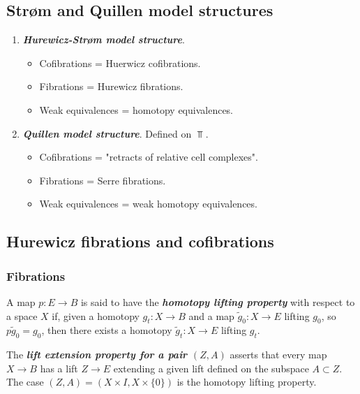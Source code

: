 \begin{remark}
\subsection{Str\o m and Quillen model structures}

\begin{example}\leavevmode
\begin{enumerate}
	\item \textbf{\textit{Hurewicz-Str\o m model structure}}.
	\begin{itemize}
		\item Cofibrations = Huerwicz cofibrations.
		\item Fibrations = Hurewicz fibrations.
		\item Weak equivalences = homotopy equivalences.
	\end{itemize}
	\item \textbf{\textit{Quillen model structure}}. Defined on $\Top$.
	\begin{itemize}
		\item Cofibrations = "retracts of relative cell complexes".
		\item Fibrations = Serre fibrations.
		\item Weak equivalences = weak homotopy equivalences.
	\end{itemize}
\end{enumerate}
\end{example}

\subsection{Hurewicz fibrations and cofibrations}

\subsubsection{Fibrations}

\begin{definition}[Hatcher]
	 A map $p:E\to B$ is said to have the \textbf{\textit{homotopy lifting property}} with respect to a space $X$ if, given a homotopy $g_t:X\to B$ and a map $\tilde{g}_0:X\to E$ lifting $g_0$, so $p\tilde{g}_0=g_0$, then there exists a homotopy $\tilde{g}_t:X\to E$ lifting $g_t$.
	
	The \textbf{\textit{lift extension property for a pair $(Z,A)$}} asserts that every map $X\to B$ has a lift $Z\to E$ extending a given lift defined on the subspace $A\subset Z$. The case $(Z,A)=(X\times I,X\times\{0\})$ is the homotopy lifting property.
	

\end{definition}
\end{remark}
